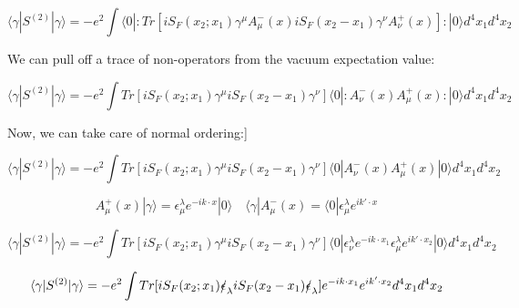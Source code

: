\documentclass[a4]{article}
\begin{document}
        \begin{framed}

            \begin{equation}
                \langle \gamma | S^{(2)} | \gamma \rangle = - e^{2} \int \langle 0 |: Tr [i S_{F} (x_2; x_1) \gamma^{\mu} A_{\mu}^{-} (x) i S_{F} (x_2 - x_1) \gamma^{\nu} A_{\nu}^{+} (x)] :| 0 \rangle d^4 x_1 d^4 x_2
            \end{equation}

            We can pull off a trace of non-operators from the vacuum expectation value:

            \begin{equation}
                \langle \gamma | S^{(2)} | \gamma \rangle = - e^{2} \int Tr [i S_{F} (x_2; x_1) \gamma^{\mu} i S_{F} (x_2 - x_1) \gamma^{\nu}] \langle 0 |: A_{\nu}^{-} (x) A_{\mu}^{+} (x) :| 0 \rangle d^4 x_1 d^4 x_2
            \end{equation}

            Now, we can take care of normal ordering:]

            \begin{equation}
                \langle \gamma | S^{(2)} | \gamma \rangle = - e^{2} \int Tr [i S_{F} (x_2; x_1) \gamma^{\mu} i S_{F} (x_2 - x_1) \gamma^{\nu}] \langle 0 | A_{\nu}^{-} (x) A_{\mu}^{+} (x) | 0 \rangle d^4 x_1 d^4 x_2
            \end{equation}

            \begin{equation}
                A_{\mu}^{+} (x) | \gamma \rangle = \epsilon^{\lambda}_{\mu} e^{- i k \cdot x} | 0 \rangle \quad \langle \gamma | A_{\mu}^{-} (x) = \langle 0 | \epsilon^{\lambda}_{\mu} e^{i k' \cdot x}
            \end{equation}

            \begin{equation}
                \langle \gamma | S^{(2)} | \gamma \rangle = - e^{2} \int Tr [i S_{F} (x_2; x_1) \gamma^{\mu} i S_{F} (x_2 - x_1) \gamma^{\nu}] \langle 0 | \epsilon^{\lambda}_{\nu} e^{- i k \cdot x_1} \epsilon^{\lambda}_{\mu} e^{i k' \cdot x_2} | 0 \rangle d^4 x_1 d^4 x_2
            \end{equation}

            \begin{equation}
                \langle \gamma | S^{(2)} | \gamma \rangle = - e^{2} \int Tr [i S_{F} (x_2; x_1) \slashed{\epsilon}_{\lambda} i S_{F} (x_2 - x_1) \slashed{\epsilon}_{\lambda}] e^{- i k \cdot x_1} e^{i k' \cdot x_2} d^4 x_1 d^4 x_2
            \end{equation}


\end{framed}
\end{document}
